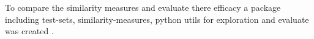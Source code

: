 \documentclass[../main.tex]{subfiles}
\begin{document}
To compare the similarity measures and evaluate there efficacy a package including test-sets,
similarity-measures, python utils for exploration and evaluate was created .
\end{document}
